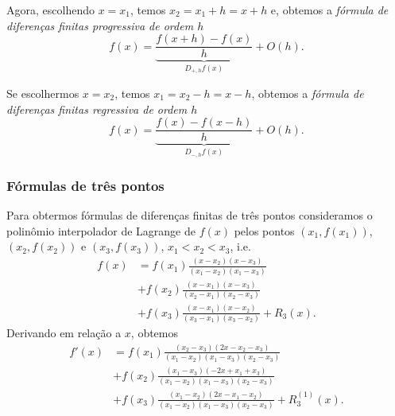 Agora, escolhendo $x=x_1$, temos $x_2 = x_1 + h = x + h$ e, obtemos a \emph{fórmula de diferenças finitas progressiva de ordem $h$}
\begin{equation}
  f(x) = \underbrace{\frac{f(x+h) - f(x)}{h}}_{D_{+,h}f(x)} + O(h).
\end{equation}

Se escolhermos $x=x_2$, temos $x_1 = x_2 - h = x - h$, obtemos a \emph{fórmula de diferenças finitas regressiva de ordem $h$}
\begin{equation}
  f(x) = \underbrace{\frac{f(x) - f(x-h)}{h}}_{D_{-,h}f(x)} + O(h).
\end{equation}

\subsubsection{Fórmulas de três pontos}

Para obtermos fórmulas de diferenças finitas de três pontos consideramos o polinômio interpolador de Lagrange de $f(x)$ pelos pontos $(x_1, f(x_1))$, $(x_2, f(x_2))$ e $(x_3, f(x_3))$, $x_1<x_2<x_3$, i.e.
\begin{align}
  f(x) &= f(x_1)\frac{(x-x_2)(x-x_3)}{(x_1-x_2)(x_1-x_3)} \\
  &+ f(x_2)\frac{(x-x_1)(x-x_3)}{(x_2-x_1)(x_2-x_3)} \\
  &+ f(x_3)\frac{(x-x_1)(x-x_2)}{(x_3-x_1)(x_3-x_2)} + R_3(x).
\end{align}
Derivando em relação a $x$, obtemos
\begin{align}\label{eq:aux_deriv1}
  f'(x) &= f{\left (x_{1} \right )}\frac{\left(x_{2} - x_{3}\right) \left(2 x- x_{2} - x_{3}\right)}{\left(x_{1} - x_{2}\right) \left(x_{1} - x_{3}\right) \left(x_{2} - x_{3}\right)} \\
  &+ f{\left (x_{2} \right )}\frac{\left(x_{1} - x_{3}\right) \left(- 2 x + x_{1} + x_{3}\right)}{\left(x_{1} - x_{2}\right) \left(x_{1} - x_{3}\right) \left(x_{2} - x_{3}\right)}\\
  &+ f\left(x_{3} \right)\frac{\left(x_{1} - x_{2}\right)\left(2 x - x_{1} - x_{2}\right)}{\left(x_{1} - x_{2}\right) \left(x_{1} - x_{3}\right) \left(x_{2} - x_{3}\right)} + R_3^{(1)}(x).
\end{align}

